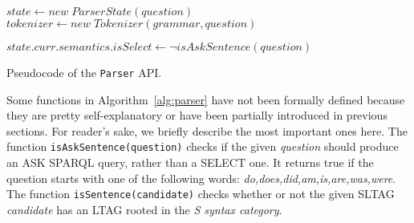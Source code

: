 \begin{algorithm}[t]

 {
	$state \leftarrow new\; ParserState(question)$ \\
	$tokenizer \leftarrow new\; Tokenizer(grammar,question)$ \\
	

	

	$state.curr.semantics.isSelect \leftarrow \neg isAskSentence(question)$ \\
	
}
\caption{Pseudocode of the \texttt{Parser} API.}
\label{alg:parser}
\end{algorithm}

Some functions in Algorithm~\ref{alg:parser} have not been formally defined because they are pretty self-explanatory or have been partially introduced in previous sections.
%
For reader's sake, we briefly describe the most important ones here.
%
The function \texttt{isAskSentence(question)} checks if the given \textit{question} should produce an ASK SPARQL query, rather than a SELECT one. It returns true if the question starts with one of the following words: \textit{do,does,did,am,is,are,was,were}.
%
The function \texttt{isSentence(candidate)} checks whether or not the given SLTAG \textit{candidate} has an LTAG rooted in the \textit{S syntax category}.

